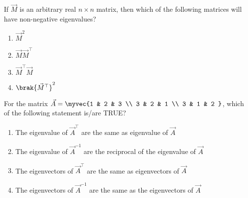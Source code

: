 \item If $\vec{M}$ is an arbitrary real $n \times n$ matrix, then which of the following matrices will have non-negative eigenvalues?
\hfill{}
\begin{enumerate}
\item $\vec{M}^2$
\item $\vec{M}\vec{M}^{\top}$
\item $\vec{M}^{\top}\vec{M}$
\item $\brak{\vec{M}^{\top}}^2$
\end{enumerate}
\item For the matrix
$\vec{A} = \myvec{1 & 2 & 3 \\
3 & 2 & 1 \\
3 & 1 & 2
}$,
which of the following statement is/are TRUE?
\hfill{}
\begin{enumerate}
\item The eigenvalue of $\vec{A}^{\top}$ are the same as eigenvalue of  $\vec{A}$
\item The eigenvalue of $\vec{A}^{-1}$ are the reciprocal of the eigenvalue of  $\vec{A}$
\item The eigenvectors of $\vec{A}^{\top}$ are the same as eigenvectors of  $\vec{A}$
\item The eigenvectors of $\vec{A}^{-1}$ are the same as the eigenvectors of  $\vec{A}$
\end{enumerate}
